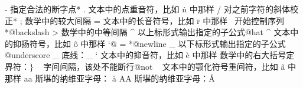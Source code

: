 \capcs - {指定合法的断字点}*{\@minus}
\capcs . {文本中的点重音符，比如 \.n 中那样}{}{\@dot}%
\capcs / {对之前字符的斜体校正}*{\@slash}
\capcs ; {数学中的较大间隔}{}{\@semi}
\capcs = {文本中的长音符号，比如 \=r 中那样}{}{\@equal}
\capac \ {开始控制序列}*{@backslash}
\capcs > {数学中的中等间隔}{}{\@greater}
\capac ^ {以上标形式输出指定的子公式}{}{@hat}
\capcs ^ {文本中的抑扬符号，比如 \^o 中那样}{}{\@hat}
{\catcode `@ = 
*{@newline}
}%
\capac _ {以下标形式输出指定的子公式}{}{@underscore}
\capcs _ {底线：\_}{}{\@underscore}
\capcs ` {文本中的抑音符，比如 \`e 中那样}{}{\@lquote}
\capac { {开始编组}{}{@lbrace}
\capcs { {数学中的左大括号定界符：$\{$}{}{\@lbrace}
\capcs | {数学中的平行线：$\Vert$}{}{\@bar}
\capac } {结束编组}{}{@rbrace}
\capcs } {数学中的右大括号定界符：$\}$}{}{\@rbrace}
\capac ~ {字间间隔，该处不能断行}{}{@not}
\capcs ~ {文本中的颚化符号重间符，比如 \~a 中那样}{}{\@not}%
%
\capcs aa {斯堪的纳维亚字母： \aa}{}{}
\capcs AA {斯堪的纳维亚字母：\AA}{}{}

